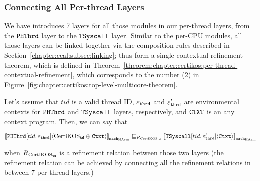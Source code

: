 \subsubsection{Connecting All Per-thread Layers}
We have introduces 7 layers for all those modules in our per-thread layers, from the ${\mathrm{\texttt{PHThrd}}}$ layer to the 
${\mathrm{\texttt{TSyscall}}}$ layer.
Similar to the per-CPU modules, all those layers can be linked together via the composition rules described in Section~\ref{chapter:ccal:subsec:linking};
thus form a single contextual refinement theorem, which is defined in Theorem~\ref{theorem:chapter:certikos:per-thread-contextual-refinement},
which corresponds to the number (2) in Figure~\ref{fig:chapter:certikos:top-level-multicore-theorem}.
\begin{theorem}
\label{theorem:chapter:certikos:per-thread-contextual-refinement}
Let's assume that $tid$ is a valid thread ID, ${\varepsilon}_{{\mathrm{\texttt{thrd}}}}$ and  ${\varepsilon}'_{{\mathrm{\texttt{thrd}}}}$ are environmental contexts for 
${\mathrm{\texttt{PHThrd}}}$  and ${\mathrm{\texttt{TSyscall}}}$ layers, respectively, and ${\mathrm{\texttt{CTXT}}}$ is an any context program. Then, we can say that
\begin{center}
${[\![{{\mathrm{\texttt{PHThrd}}}[tid, {\varepsilon}_{{\mathrm{\texttt{thrd}}}}]} \langle {\mathrm{CertiKOS}_{{\mathrm{\texttt{td}}}} \oplus {\mathrm{\texttt{Ctxt}}}} \rangle]\!]}_{{\mathrm{\texttt{mach}}}_{\mathrm{HAsm}}} \sqsubseteq_{R_{\mathrm{CertiKOS}_{\mathrm{\texttt{td}}}}} {[\![{{\mathrm{\texttt{TSyscall}}}[tid, {\varepsilon}'_{{\mathrm{\texttt{thrd}}}}]} \langle {{\mathrm{\texttt{Ctxt}}}} \rangle]\!]}_{{{\mathrm{\texttt{mach}}}_{\mathrm{HAsm}}}}$
\end{center}
when ${R_{\mathrm{CertiKOS}_{\mathrm{\texttt{td}}}}}$ is a refinement relation between those two layers (the refinement relation can be achieved by 
connecting all the refinement relations in between 7 per-thread layers.)
\end{theorem}


